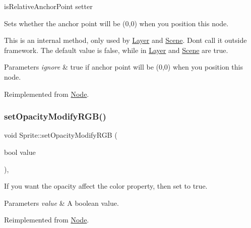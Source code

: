 is\+Relative\+Anchor\+Point setter 

Sets whether the anchor point will be (0,0) when you position this node.

This is an internal method, only used by \hyperlink{classLayer}{Layer} and \hyperlink{classScene}{Scene}. Don\textquotesingle{}t call it outside framework. The default value is false, while in \hyperlink{classLayer}{Layer} and \hyperlink{classScene}{Scene} are true.


\begin{DoxyParams}{Parameters}
{\em ignore} & true if anchor point will be (0,0) when you position this node. \\
\hline
\end{DoxyParams}


Reimplemented from \hyperlink{classNode_a75e8f6a6a46358d6faf8683e720d47b5}{Node}.

\mbox{\label{classSprite_adf41c2705eb6b1317a14c469c84da78c}} 
\subsubsection{\texorpdfstring{set\+Opacity\+Modify\+R\+G\+B()}{setOpacityModifyRGB()}\hspace{0.1cm}{\footnotesize\ttfamily [1/2]}}
{\footnotesize\ttfamily void Sprite\+::set\+Opacity\+Modify\+R\+GB (\begin{DoxyParamCaption}\item[{bool}]{value }\end{DoxyParamCaption})\hspace{0.3cm}{\ttfamily [override]}, {\ttfamily [virtual]}}

If you want the opacity affect the color property, then set to true. 
\begin{DoxyParams}{Parameters}
{\em value} & A boolean value. \\
\hline
\end{DoxyParams}


Reimplemented from \hyperlink{classNode_a978c5435ab23f76e9efdf0f7e9e288e5}{Node}.

\mbox{\label{classSprite_a4b86bd0afb6fa3bb3ed5521041800458}} 

